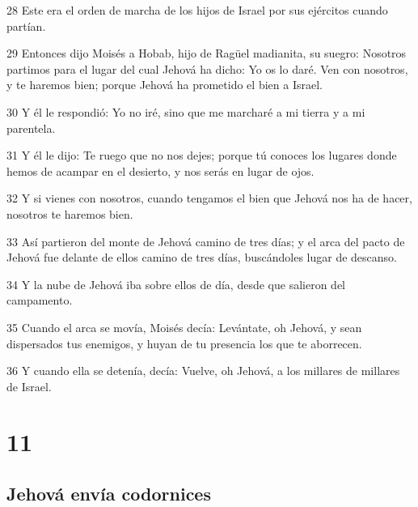\par 28 Este era el orden de marcha de los hijos de Israel por sus ejércitos cuando partían.
\par 29 Entonces dijo Moisés a Hobab, hijo de Ragüel madianita, su suegro: Nosotros partimos para el lugar del cual Jehová ha dicho: Yo os lo daré. Ven con nosotros, y te haremos bien; porque Jehová ha prometido el bien a Israel.
\par 30 Y él le respondió: Yo no iré, sino que me marcharé a mi tierra y a mi parentela.
\par 31 Y él le dijo: Te ruego que no nos dejes; porque tú conoces los lugares donde hemos de acampar en el desierto, y nos serás en lugar de ojos.
\par 32 Y si vienes con nosotros, cuando tengamos el bien que Jehová nos ha de hacer, nosotros te haremos bien.
\par 33 Así partieron del monte de Jehová camino de tres días; y el arca del pacto de Jehová fue delante de ellos camino de tres días, buscándoles lugar de descanso.
\par 34 Y la nube de Jehová iba sobre ellos de día, desde que salieron del campamento.
\par 35 Cuando el arca se movía, Moisés decía: Levántate, oh Jehová, y sean dispersados tus enemigos, y huyan de tu presencia los que te aborrecen.
\par 36 Y cuando ella se detenía, decía: Vuelve, oh Jehová, a los millares de millares de Israel.

\chapter{11}

\section*{Jehová envía codornices}

